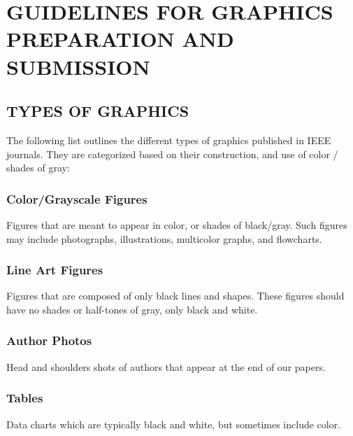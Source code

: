 \documentclass{IEEEoj}
\begin{document}
\section{GUIDELINES FOR GRAPHICS PREPARATION 
AND SUBMISSION}
\subsection{TYPES OF GRAPHICS}
The following list outlines the different types of graphics published in 
IEEE journals. They are categorized based on their construction, and use of 
color / shades of gray:

\subsubsection{Color/Grayscale Figures}
Figures that are meant to appear in color, or shades of black/gray. Such 
figures may include photographs, illustrations, multicolor graphs, and 
flowcharts.

\subsubsection{Line Art Figures}
Figures that are composed of only black lines and shapes. These figures 
should have no shades or half-tones of gray, only black and white.

\subsubsection{Author Photos}
Head and shoulders shots of authors that appear at the end of our papers. 

\subsubsection{Tables}
Data charts which are typically black and white, but sometimes include 
color.
\end{document}
